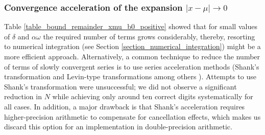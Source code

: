 \documentclass[10pt,a4paper,oneside]{article}
\numberwithin{equation}{section}
\begin{document}
\subsubsection{Convergence acceleration of the expansion $|x-\mu| \to 0$}
Table \ref{table_bound_remainder_xmu_b0_positive} showed that for small values of $\delta$ and $\alpha \omega$ the required number of terms grows considerably, thereby, resorting to numerical integration (see Section \ref{section_numerical_integration}) might be a more efficient approach. Alternatively, a common technique to reduce the number of terms of slowly convergent series is to use series acceleration methods (Shank's transformation and Levin-type transformations among others \cite{Gil2007}). 
Attempts to use Shank's transformation were unsuccessful; we did not observe a significant reduction in $N$ while achieving only around ten correct digits systematically for all cases. In addition, a major drawback is that Shank's acceleration requires higher-precision arithmetic to compensate for cancellation effects, which makes us discard this option for an implementation in double-precision arithmetic. 
\end{document}
